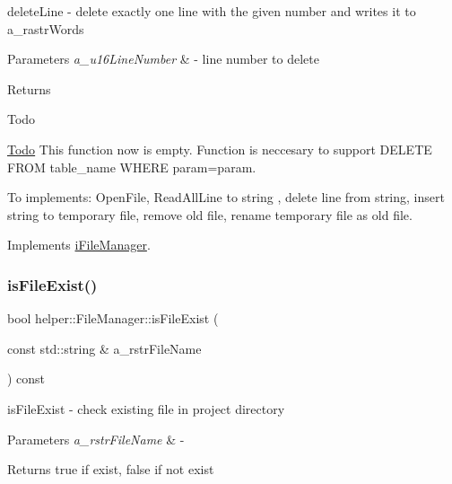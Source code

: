 delete\+Line -\/ delete exactly one line with the given number and writes it to a\+\_\+rastr\+Words 


\begin{DoxyParams}{Parameters}
{\em a\+\_\+u16\+Line\+Number} & -\/ line number to delete \\
\hline
\end{DoxyParams}
\begin{DoxyReturn}{Returns}

\end{DoxyReturn}
\begin{DoxyRefDesc}{Todo}
\item[\mbox{\hyperlink{todo__todo000001}{Todo}}]This function now is empty. Function is neccesary to support D\+E\+L\+E\+TE F\+R\+OM table\+\_\+name W\+H\+E\+RE param=param. 

To implements\+: Open\+File, Read\+All\+Line to string , delete line from string, insert string to temporary file, remove old file, rename temporary file as old file.\end{DoxyRefDesc}


Implements \mbox{\hyperlink{classi_file_manager}{i\+File\+Manager}}.

\mbox{\label{classhelper_1_1_file_manager_ad68fd52b8f593f9e08046d1edd18c853}} 
\subsubsection{\texorpdfstring{isFileExist()}{isFileExist()}}
{\footnotesize\ttfamily bool helper\+::\+File\+Manager\+::is\+File\+Exist (\begin{DoxyParamCaption}\item[{const std\+::string \&}]{a\+\_\+rstr\+File\+Name }\end{DoxyParamCaption}) const}



is\+File\+Exist -\/ check existing file in project directory 


\begin{DoxyParams}{Parameters}
{\em a\+\_\+rstr\+File\+Name} & -\/ \\
\hline
\end{DoxyParams}
\begin{DoxyReturn}{Returns}
true if exist, false if not exist 
\end{DoxyReturn}
\mbox{\label{classhelper_1_1_file_manager_a0b4bac7ff95be0bdad0b70987a25b63c}} 
